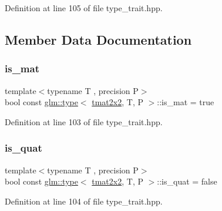 Definition at line 105 of file type\+\_\+trait.\+hpp.



\subsection{Member Data Documentation}
\mbox{\label{structglm_1_1type_3_01tmat2x2_00_01_t_00_01_p_01_4_ad4cab148bf9dfc3590df0d54c0b91841}} 
\subsubsection{\texorpdfstring{is\_mat}{is\_mat}}
{\footnotesize\ttfamily template$<$typename T , precision P$>$ \\
bool const \mbox{\hyperlink{structglm_1_1type}{glm\+::type}}$<$ \mbox{\hyperlink{structglm_1_1tmat2x2}{tmat2x2}}, T, P $>$\+::is\+\_\+mat = true\hspace{0.3cm}{\ttfamily [static]}}



Definition at line 103 of file type\+\_\+trait.\+hpp.

\mbox{\label{structglm_1_1type_3_01tmat2x2_00_01_t_00_01_p_01_4_adc925aea1a0a8eb2b8b59c5a78329d4c}} 
\subsubsection{\texorpdfstring{is\_quat}{is\_quat}}
{\footnotesize\ttfamily template$<$typename T , precision P$>$ \\
bool const \mbox{\hyperlink{structglm_1_1type}{glm\+::type}}$<$ \mbox{\hyperlink{structglm_1_1tmat2x2}{tmat2x2}}, T, P $>$\+::is\+\_\+quat = false\hspace{0.3cm}{\ttfamily [static]}}



Definition at line 104 of file type\+\_\+trait.\+hpp.

\mbox{\label{structglm_1_1type_3_01tmat2x2_00_01_t_00_01_p_01_4_a4ae662052764bbc11115ab73fac7b053}} 
